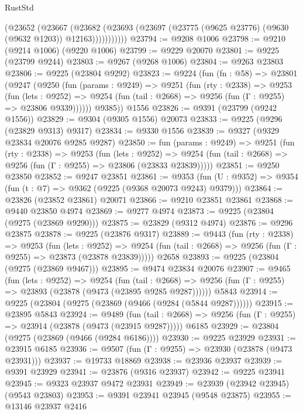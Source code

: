 \begin{lexlean}{RustStd}
\begin{coremodule}
              (@23652
                (@23667
                  (@23682
                    (@23693 (@23697 (@23775 (@9625 @23776) (@9630 (@9632 @1203)) @12163)))))))))))
@23794 := @9208 @1006
@23798 := @9210 (@9214 @1006) (@9220 @1006)
@23799 := @9229 @20070
@23801 := @9225 (@23799 @9244)
@23803 := @9267 (@9268 @1006)
@23804 := @9263 @23803
@23806 := @9225 (@23804 @9292)
@23823 := @9224
    (fun (fn : @58) =>
    @23801
      (@9247
        (@9250
          (fun (params : @9249) =>
          @9251
            (fun (rty : @2338) =>
            @9253
              (fun (lets : @9252) =>
              @9254 (fun (tail : @2668) => @9256 (fun (Γ : @9255) => @23806 @9339))))))
        @9385))
    @1556
@23826 := @9391 (@23799 (@9242 @1556))
@23829 := @9304 (@9305 @1556) @20073
@23833 := @9225 (@9296 (@23829 @9313) @9317)
@23834 := @9330 @1556
@23839 := @9327 (@9329 @23834 @20076 @9285 @9287)
@23850 := fun (params : @9249) =>
  @9251
    (fun (rty : @2338) =>
    @9253
      (fun (lets : @9252) =>
      @9254 (fun (tail : @2668) => @9256 (fun (Γ : @9255) => @23806 (@23833 @23839)))))
@23851 := @9250 @23850
@23852 := @9247 @23851
@23861 := @9353
    (fun (U : @9352) => @9354 (fun (t : @7) => @9362 (@9225 (@9368 @20073 @9243) @9379)))
@23864 := @23826 (@23852 @23861) @20071
@23866 := @9210 @23851 @23861
@23868 := @9440 @23850 @4974
@23869 := @9277 @4974
@23873 := @9225 (@23804 (@9275 (@23869 @9290)))
@23875 := @23829 (@9312 @4974)
@23876 := @9296 @23875
@23878 := @9225 (@23876 @9317)
@23889 := @9443
    (fun (rty : @2338) =>
    @9253
      (fun (lets : @9252) =>
      @9254 (fun (tail : @2668) => @9256 (fun (Γ : @9255) => @23873 (@23878 @23839)))))
    @2658
@23893 := @9225 (@23804 (@9275 (@23869 @9467)))
@23895 := @9474 @23834 @20076
@23907 := @9465
    (fun (lets : @9252) =>
    @9254
      (fun (tail : @2668) =>
      @9256 (fun (Γ : @9255) => @23893 (@23878 (@9473 (@23895 @9285 @9287))))))
    @5843
@23914 := @9225 (@23804 (@9275 (@23869 (@9466 (@9284 (@5844 @9287))))))
@23915 := @23895 @5843
@23924 := @9489
    (fun (tail : @2668) => @9256 (fun (Γ : @9255) => @23914 (@23878 (@9473 (@23915 @9287)))))
    @6185
@23929 := @23804 (@9275 (@23869 (@9466 (@9284 @6186))))
@23930 := @9225 @23929
@23931 := @23915 @6185
@23936 := @9507 (fun (Γ : @9255) => @23930 (@23878 (@9473 @23931)))
@23937 := @19733 @18869
@23938 := @23936 @23937
@23939 := @9391 @23929
@23941 := @23876 (@9316 @23937)
@23942 := @9225 @23941
@23945 := @9323 @23937 @9472 @23931
@23949 := @23939 (@23942 @23945) (@9543 @23803)
@23953 := @9391 @23941 @23945 (@9548 @23875)
@23955 := @13146 @23937 @2416

\end{coremodule}
\end{lexlean}
